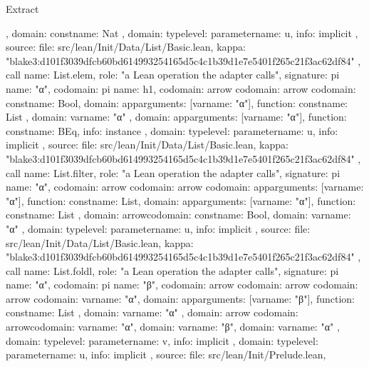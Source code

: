 \begin{lexlean}{Extract}
\begin{toolingmodule}
{{{{{          },
          domain: const{name: Nat}
        },
        domain: type{level: parameter{name: u}},
        info: implicit
      },
      source: {
        file: src/lean/Init/Data/List/Basic.lean,
        kappa: "blake3:d101f3039dfcb60bd614993254165d5c4c1b39d1e7e5401f265c21f3ac62df84"
      }
    },
    call{
      name: List.elem,
      role: "a Lean operation the adapter calls",
      signature: pi{
        name: "α",
        codomain: pi{
          name: h1,
          codomain: arrow{
            codomain: arrow{
              codomain: const{name: Bool},
              domain: app{arguments: [var{name: "α"}], function: const{name: List}}
            },
            domain: var{name: "α"}
          },
          domain: app{arguments: [var{name: "α"}], function: const{name: BEq}},
          info: instance
        },
        domain: type{level: parameter{name: u}},
        info: implicit
      },
      source: {
        file: src/lean/Init/Data/List/Basic.lean,
        kappa: "blake3:d101f3039dfcb60bd614993254165d5c4c1b39d1e7e5401f265c21f3ac62df84"
      }
    },
    call{
      name: List.filter,
      role: "a Lean operation the adapter calls",
      signature: pi{
        name: "α",
        codomain: arrow{
          codomain: arrow{
            codomain: app{arguments: [var{name: "α"}], function: const{name: List}},
            domain: app{arguments: [var{name: "α"}], function: const{name: List}}
          },
          domain: arrow{codomain: const{name: Bool}, domain: var{name: "α"}}
        },
        domain: type{level: parameter{name: u}},
        info: implicit
      },
      source: {
        file: src/lean/Init/Data/List/Basic.lean,
        kappa: "blake3:d101f3039dfcb60bd614993254165d5c4c1b39d1e7e5401f265c21f3ac62df84"
      }
    },
    call{
      name: List.foldl,
      role: "a Lean operation the adapter calls",
      signature: pi{
        name: "α",
        codomain: pi{
          name: "β",
          codomain: arrow{
            codomain: arrow{
              codomain: arrow{
                codomain: var{name: "α"},
                domain: app{arguments: [var{name: "β"}], function: const{name: List}}
              },
              domain: var{name: "α"}
            },
            domain: arrow{
              codomain: arrow{codomain: var{name: "α"}, domain: var{name: "β"}},
              domain: var{name: "α"}
            }
          },
          domain: type{level: parameter{name: v}},
          info: implicit
        },
        domain: type{level: parameter{name: u}},
        info: implicit
      },
      source: {
        file: src/lean/Init/Prelude.lean,
}}}
\end{toolingmodule}
\end{lexlean}
